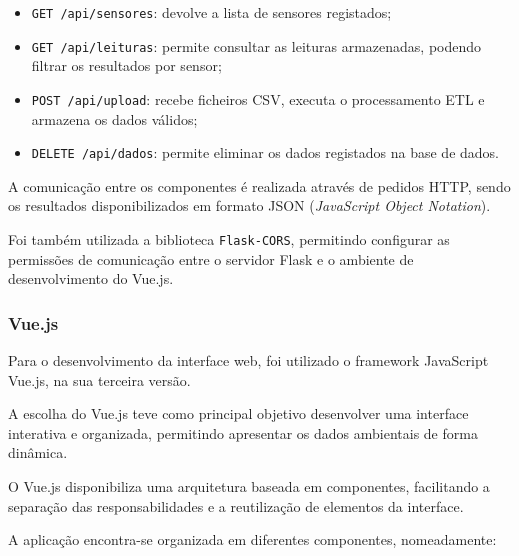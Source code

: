 \begin{itemize}

    \item \texttt{GET /api/sensores}:
    devolve a lista de sensores registados;

    \item \texttt{GET /api/leituras}:
    permite consultar as leituras armazenadas,
    podendo filtrar os resultados por sensor;

    \item \texttt{POST /api/upload}:
    recebe ficheiros CSV, executa o processamento
    ETL e armazena os dados válidos;

    \item \texttt{DELETE /api/dados}:
    permite eliminar os dados registados
    na base de dados.

\end{itemize}

A comunicação entre os componentes é realizada
através de pedidos HTTP, sendo os resultados
disponibilizados em formato JSON
(\textit{JavaScript Object Notation}).

Foi também utilizada a biblioteca
\texttt{Flask-CORS}, permitindo configurar
as permissões de comunicação entre o servidor
Flask e o ambiente de desenvolvimento do Vue.js.


\subsubsection{Vue.js}

Para o desenvolvimento da interface web, foi utilizado
o framework JavaScript Vue.js, na sua terceira versão.

A escolha do Vue.js teve como principal objetivo
desenvolver uma interface interativa e organizada,
permitindo apresentar os dados ambientais de forma
dinâmica.

O Vue.js disponibiliza uma arquitetura baseada
em componentes, facilitando a separação das
responsabilidades e a reutilização de elementos
da interface.

A aplicação encontra-se organizada em diferentes
componentes, nomeadamente:

